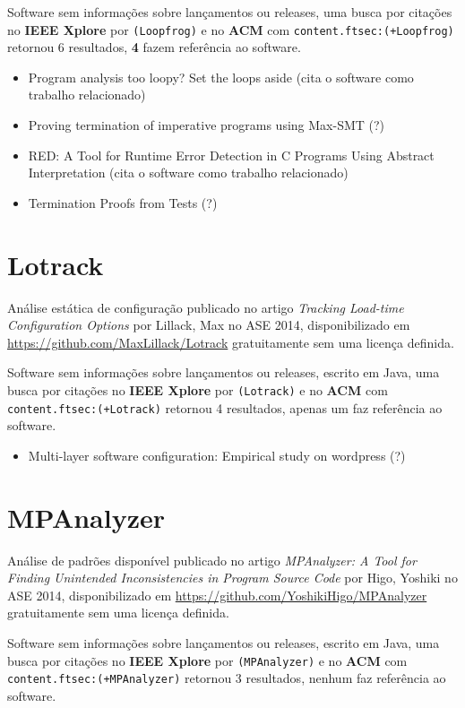 Software sem informações sobre lançamentos ou releases,
uma busca por citações no {\bf IEEE Xplore} por
\texttt{(Loopfrog)}
e no {\bf ACM} com
\texttt{content.ftsec:(+Loopfrog)}
retornou
6 resultados,
{\bf 4} fazem referência ao software.

\begin{itemize}
\item Program analysis too loopy? Set the loops aside (cita o software como trabalho relacionado)
\item Proving termination of imperative programs using Max-SMT (?)
\item RED: A Tool for Runtime Error Detection in C Programs Using Abstract Interpretation (cita o software como trabalho relacionado)
\item Termination Proofs from Tests (?)
\end{itemize}

\section{Lotrack}

Análise estática de configuração
publicado no artigo {\it Tracking Load-time Configuration Options}
por Lillack, Max
no ASE 2014,
disponibilizado em \url{https://github.com/MaxLillack/Lotrack}
gratuitamente
sem uma licença definida.

Software sem informações sobre lançamentos ou releases,
escrito em Java,
uma busca por citações no {\bf IEEE Xplore} por
\texttt{(Lotrack)}
e no {\bf ACM} com
\texttt{content.ftsec:(+Lotrack)}
retornou
4 resultados,
apenas um faz referência ao software.

\begin{itemize}
\item Multi-layer software configuration: Empirical study on wordpress (?)
\end{itemize}

\section{MPAnalyzer}

Análise de padrões disponível
publicado no artigo {\it MPAnalyzer: A Tool for Finding Unintended Inconsistencies in Program Source Code}
por Higo, Yoshiki
no ASE 2014,
disponibilizado em \url{https://github.com/YoshikiHigo/MPAnalyzer}
gratuitamente
sem uma licença definida.

Software sem informações sobre lançamentos ou releases,
escrito em Java,
uma busca por citações no {\bf IEEE Xplore} por
\texttt{(MPAnalyzer)}
e no {\bf ACM} com
\texttt{content.ftsec:(+MPAnalyzer)}
retornou
3 resultados,
nenhum faz referência ao software.


